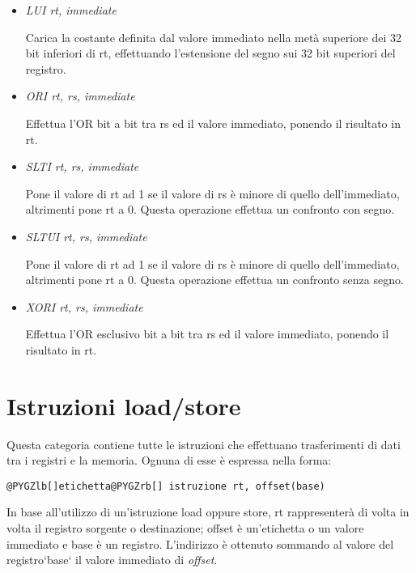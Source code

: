 \documentclass[letterpaper,10pt,italian]{sphinxmanual}
\begin{document}
\begin{itemize}
\item {} 
\emph{LUI rt, immediate}

Carica la costante definita dal valore immediato nella metà superiore dei 32
bit inferiori di rt, effettuando l'estensione del segno sui 32 bit superiori
del registro.

\item {} 
\emph{ORI rt, rs, immediate}

Effettua l'OR bit a bit tra rs ed il valore immediato, ponendo il risultato
in rt.

\item {} 
\emph{SLTI rt, rs, immediate}

Pone il valore di rt ad 1 se il valore di rs è minore di quello
dell'immediato, altrimenti pone rt a 0. Questa operazione effettua un
confronto con segno.

\item {} 
\emph{SLTUI rt, rs, immediate}

Pone il valore di rt ad 1 se il valore di rs è minore di quello
dell'immediato, altrimenti pone rt a 0. Questa operazione effettua un
confronto senza segno.

\item {} 
\emph{XORI rt, rs, immediate}

Effettua l'OR esclusivo bit a bit tra rs ed il valore immediato, ponendo il
risultato in rt.

\end{itemize}


\section{Istruzioni load/store}
\label{instructions:istruzioni-load-store}
Questa categoria contiene tutte le istruzioni che effettuano trasferimenti di
dati tra i registri e la memoria. Ognuna di esse è espressa nella forma:

\begin{Verbatim}[commandchars=@\[\]]
@PYGZlb[]etichetta@PYGZrb[] istruzione rt, offset(base)
\end{Verbatim}

In base all'utilizzo di un'istruzione load oppure store, rt rappresenterà di
volta in volta il registro sorgente o destinazione; offset è un'etichetta o un
valore immediato e base è un registro.  L'indirizzo è ottenuto sommando al
valore del registro{}`base{}` il valore immediato di \emph{offset}.
\end{document}
